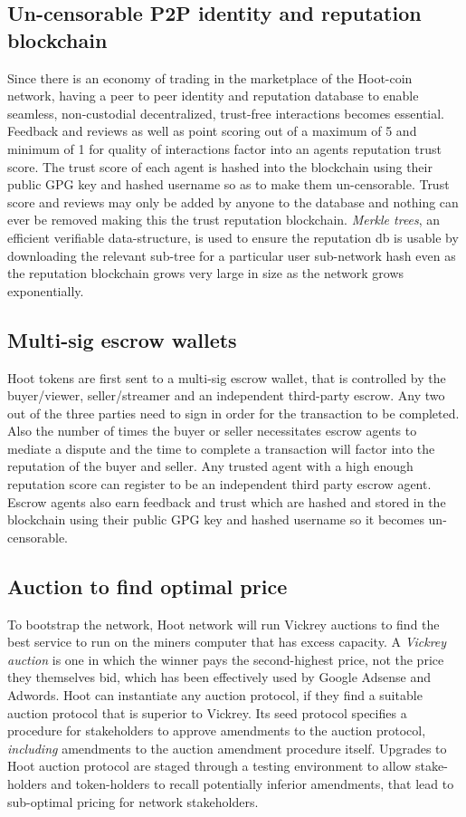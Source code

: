\documentclass{article}
\begin{document}
\subsection{Un-censorable P2P identity and reputation blockchain}
Since there is an economy of trading in the marketplace of the Hoot-coin network, having a peer to peer identity and reputation database to enable seamless, non-custodial decentralized, trust-free interactions becomes essential. Feedback and reviews as well as point scoring out of a maximum of 5 and minimum of 1 for quality of interactions factor into an agents reputation trust score. The trust score of each agent is hashed into the blockchain using their public GPG key and hashed username so as to make them un-censorable. Trust score and reviews may only be added by anyone to the database and nothing can ever be removed making this the trust reputation blockchain. \emph{Merkle trees}, an efficient verifiable data-structure, is used to ensure the reputation db is usable by downloading the relevant sub-tree for a particular user sub-network hash even as the reputation blockchain grows very large in size as the network grows exponentially.

\subsection{Multi-sig escrow wallets}
Hoot tokens are first sent to a multi-sig escrow wallet, that is controlled by the buyer/viewer, seller/streamer and an independent third-party escrow. Any two out of the three parties need to sign in order for the transaction to be completed. Also the number of times the buyer or seller necessitates escrow agents to mediate a dispute and the time to complete a transaction will factor into the reputation of the buyer and seller. Any trusted agent with a high enough reputation score can register to be an independent third party escrow agent. Escrow agents also earn feedback and trust which are hashed and stored in the blockchain using their public GPG key and hashed username so it becomes un-censorable.


\subsection{Auction to find optimal price}
To bootstrap the network, Hoot network will run Vickrey auctions to find the best service to run on the miners computer that has excess capacity. A \emph{Vickrey auction} is one in which the winner pays the second-highest price, not the price they themselves bid, which has been effectively used by Google Adsense and Adwords.
Hoot can instantiate any auction protocol, if they find a suitable auction protocol that is superior to Vickrey. Its seed protocol specifies a procedure for stakeholders to approve amendments to the auction protocol,
\emph{including} amendments to the auction amendment procedure itself. Upgrades to Hoot auction protocol are staged through a testing environment to allow stake-holders and token-holders to recall potentially inferior amendments, that lead to sub-optimal pricing for network stakeholders. 
\end{document}
